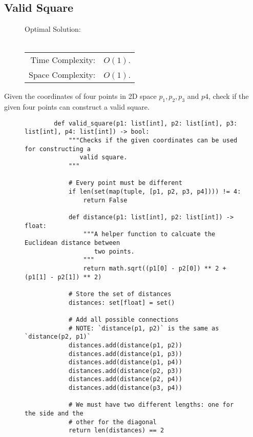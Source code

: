 
\subsection{Valid Square}

\begin{figure}[H]
    Optimal Solution:\\\\
    \begin{tabular}{rl}
        Time Complexity:& \(O(1)\).\\
        Space Complexity:& \(O(1)\).
    \end{tabular}
\end{figure}

Given the coordinates of four points in 2D space \(p_1, p_2, p_3\) and \(p4\),
check if the given four points can construct a valid square.

\begin{figure}[H]
    \centering
    \begin{verbatim}
        def valid_square(p1: list[int], p2: list[int], p3: list[int], p4: list[int]) -> bool:
            """Checks if the given coordinates can be used for constructing a
               valid square.
            """

            # Every point must be different
            if len(set(map(tuple, [p1, p2, p3, p4]))) != 4:
                return False

            def distance(p1: list[int], p2: list[int]) -> float:
                """A helper function to calcuate the Euclidean distance between
                   two points.
                """
                return math.sqrt((p1[0] - p2[0]) ** 2 + (p1[1] - p2[1]) ** 2)

            # Store the set of distances
            distances: set[float] = set()

            # Add all possible connections
            # NOTE: `distance(p1, p2)` is the same as `distance(p2, p1)`
            distances.add(distance(p1, p2))
            distances.add(distance(p1, p3))
            distances.add(distance(p1, p4))
            distances.add(distance(p2, p3))
            distances.add(distance(p2, p4))
            distances.add(distance(p3, p4))

            # We must have two different lengths: one for the side and the
            # other for the diagonal
            return len(distances) == 2
    \end{verbatim}
\end{figure}

